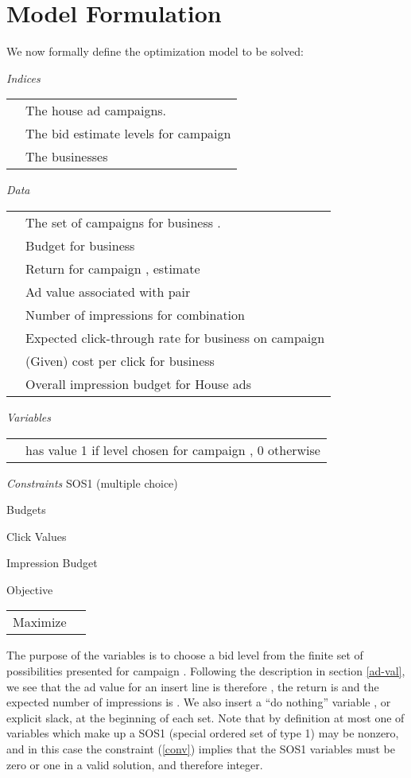 \documentclass[finalversion,simpleeqnnos]{yrl}
\begin{document}
\section{Model Formulation}   

We now formally define the optimization model to be solved:

\vskip 5pt
{\sl Indices} \nopagebreak
\vskip 5pt
   \begin{tabular}{ll}
      & The house ad campaigns.
   \\ &  The bid estimate levels for campaign 
   \\ &  The businesses
   \end{tabular}
\vskip 5pt
{\sl Data}  \nopagebreak
\vskip 5pt
   \begin{tabular}{ll}
        & The set of campaigns for business .
     \\  & Budget for business 
   \\ & Return for campaign , estimate 
   \\  & Ad value associated with pair 
   \\  & Number of impressions for combination 
   \\  & Expected click-through rate for business  on campaign 
   \\  & (Given) cost per click for business 
   \\ & Overall impression budget for House ads
\end{tabular}
\vskip 5pt
{\sl Variables}
\vskip 5pt
   \begin{tabular}{ll}
         &  has value 1 if level  chosen for campaign , 0 otherwise
   \end{tabular}
\vskip 5pt

{\sl Constraints}
\vskip 5pt
SOS1 (multiple choice)
 
\vskip 5pt
Budgets
 
\vskip 5pt
Click Values
 
\vskip 5pt
Impression Budget
 


\vskip 5pt

Objective
\vskip 5pt
   \begin{tabular}{ll}
    {\rm Maximize} &
   \end{tabular}
\vskip 10pt

The purpose of the  variables is to choose a bid level from the finite set of possibilities presented for campaign . Following the description in section \ref{ad-val}, we see that the ad value for an insert line  is therefore , the return is  and the expected number of impressions is . We also insert a ``do nothing'' variable , or explicit slack, at the beginning of each set. Note that by definition at most one of variables which make up a SOS1 (special ordered set \cite{SOS} of type 1) may be nonzero, and in this case the constraint (\ref{conv}) implies that the SOS1 variables must be zero or one in a valid solution, and therefore integer.
\end{document}
